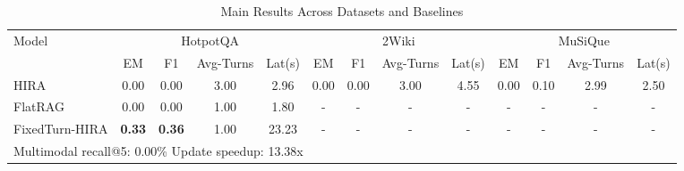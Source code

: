 \begin{table}[t]
\centering
\caption{Main Results Across Datasets and Baselines}
\begin{tabular}{l|cccc|cccc|cccc}
\hline
Model & \multicolumn{4}{c|}{HotpotQA} & \multicolumn{4}{c|}{2Wiki} & \multicolumn{4}{c}{MuSiQue} \\
& EM & F1 & Avg-Turns & Lat(s) & EM & F1 & Avg-Turns & Lat(s) & EM & F1 & Avg-Turns & Lat(s) \\
\hline
HIRA & 0.00 & 0.00 & 3.00 & 2.96 & 0.00 & 0.00 & 3.00 & 4.55 & 0.00 & 0.10 & 2.99 & 2.50 \\
FlatRAG & 0.00 & 0.00 & 1.00 & 1.80 & - & - & - & - & - & - & - & - \\
FixedTurn-HIRA & \textbf{0.33} & \textbf{0.36} & 1.00 & 23.23 & - & - & - & - & - & - & - & - \\
\hline
\multicolumn{13}{l}{Multimodal recall@5: 0.00\% \quad Update speedup: 13.38x} \\
\hline
\end{tabular}
\end{table}
